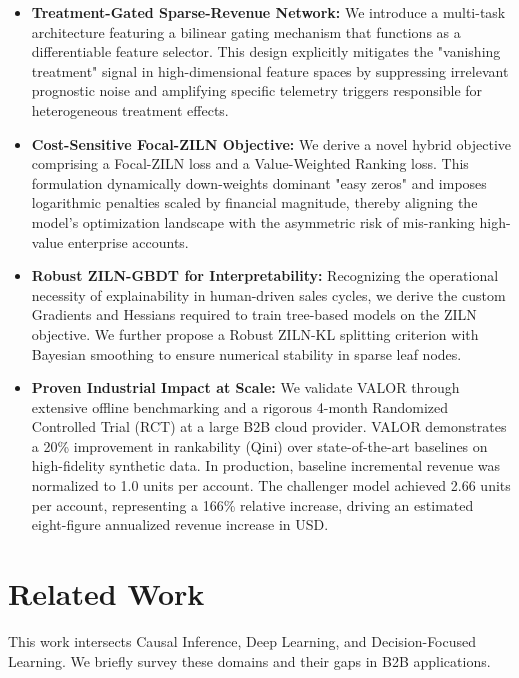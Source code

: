 \documentclass[runningheads]{llncs}
\begin{document}
\begin{itemize}
    \item \textbf{Treatment-Gated Sparse-Revenue Network:} We introduce a multi-task architecture featuring a bilinear gating mechanism that functions as a differentiable feature selector. This design explicitly mitigates the "vanishing treatment" signal in high-dimensional feature spaces by suppressing irrelevant prognostic noise and amplifying specific telemetry triggers responsible for heterogeneous treatment effects.
    
    \item \textbf{Cost-Sensitive Focal-ZILN Objective:} We derive a novel hybrid objective comprising a Focal-ZILN loss and a Value-Weighted Ranking loss. This formulation dynamically down-weights dominant "easy zeros" and imposes logarithmic penalties scaled by financial magnitude, thereby aligning the model's optimization landscape with the asymmetric risk of mis-ranking high-value enterprise accounts.
    
    \item \textbf{Robust ZILN-GBDT for Interpretability:} Recognizing the operational necessity of explainability in human-driven sales cycles, we derive the custom Gradients and Hessians required to train tree-based models on the ZILN objective. We further propose a Robust ZILN-KL splitting criterion with Bayesian smoothing to ensure numerical stability in sparse leaf nodes.
    
\item \textbf{Proven Industrial Impact at Scale:} We validate VALOR through extensive offline benchmarking and a rigorous 4-month Randomized Controlled Trial (RCT) at a large B2B cloud provider. VALOR demonstrates a 20\% improvement in rankability (Qini) over state-of-the-art baselines on high-fidelity synthetic data. In production, baseline incremental revenue was normalized to 1.0 units per account. The challenger model achieved 2.66 units per account, representing a 166\% relative increase, driving an estimated eight-figure annualized revenue increase in USD.
\end{itemize}

\section{Related Work}
This work intersects Causal Inference, Deep Learning, and Decision-Focused Learning. We briefly survey these domains and their gaps in B2B applications.
\end{document}
